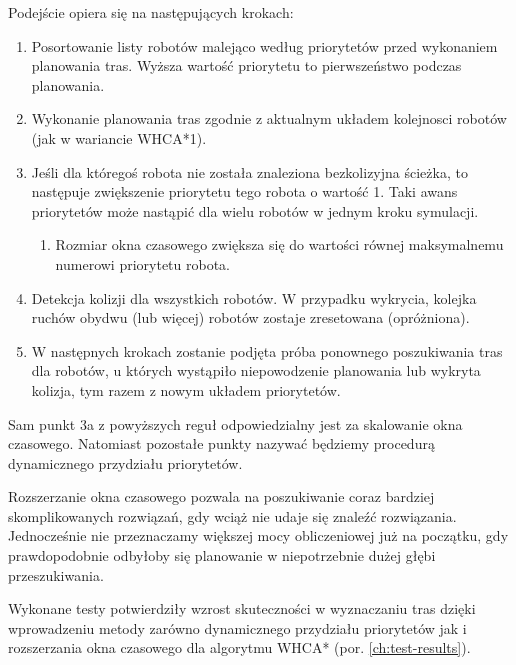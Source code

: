 Podejście opiera się na następujących krokach:
\begin{enumerate}
	\item Posortowanie listy robotów malejąco według priorytetów przed wykonaniem planowania tras. Wyższa wartość priorytetu to pierwszeństwo podczas planowania.
	\item Wykonanie planowania tras zgodnie z aktualnym układem kolejnosci robotów (jak w wariancie WHCA*1).
	\item Jeśli dla któregoś robota nie została znaleziona bezkolizyjna ścieżka, to następuje zwiększenie priorytetu tego robota o wartość 1. Taki awans priorytetów może nastąpić dla wielu robotów w jednym kroku symulacji.
	\begin{enumerate}
		\item Rozmiar okna czasowego zwiększa się do wartości równej maksymalnemu numerowi priorytetu robota.
	\end{enumerate}
	\item Detekcja kolizji dla wszystkich robotów. W przypadku wykrycia, kolejka ruchów obydwu (lub więcej) robotów zostaje zresetowana (opróżniona).
	\item W następnych krokach zostanie podjęta próba ponownego poszukiwania tras dla robotów, u których wystąpiło niepowodzenie planowania lub wykryta kolizja, tym razem z nowym układem priorytetów.
\end{enumerate}

Sam punkt 3a z powyższych reguł odpowiedzialny jest za skalowanie okna czasowego. Natomiast pozostałe punkty nazywać będziemy procedurą dynamicznego przydziału priorytetów.

Rozszerzanie okna czasowego pozwala na poszukiwanie coraz bardziej skomplikowanych rozwiązań, gdy wciąż nie udaje się znaleźć rozwiązania. Jednocześnie nie przeznaczamy większej mocy obliczeniowej już na początku, gdy prawdopodobnie odbyłoby się planowanie w niepotrzebnie dużej głębi przeszukiwania.


Wykonane testy potwierdziły wzrost skuteczności w wyznaczaniu tras dzięki wprowadzeniu metody zarówno dynamicznego przydziału priorytetów jak i rozszerzania okna czasowego dla algorytmu WHCA* (por. \ref{ch:test-results}).


